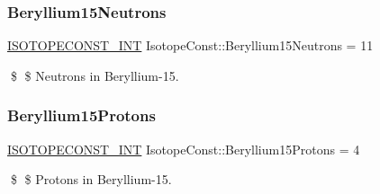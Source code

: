 \subsubsection{\texorpdfstring{Beryllium15\+Neutrons}{Beryllium15Neutrons}}
{\footnotesize\ttfamily \mbox{\hyperlink{group___isotope_const-_macros_ga5f18360b3e99483a35c32d789e62621c}{I\+S\+O\+T\+O\+P\+E\+C\+O\+N\+S\+T\+\_\+\+I\+NT}} Isotope\+Const\+::\+Beryllium15\+Neutrons = 11}

\$ \$ Neutrons in Beryllium-\/15. \mbox{\label{group___isotope_const-_beryllium-_be15_ga3765d63df0bcdcb15f79ee29c2722708}} 
\subsubsection{\texorpdfstring{Beryllium15\+Protons}{Beryllium15Protons}}
{\footnotesize\ttfamily \mbox{\hyperlink{group___isotope_const-_macros_ga5f18360b3e99483a35c32d789e62621c}{I\+S\+O\+T\+O\+P\+E\+C\+O\+N\+S\+T\+\_\+\+I\+NT}} Isotope\+Const\+::\+Beryllium15\+Protons = 4}

\$ \$ Protons in Beryllium-\/15. 